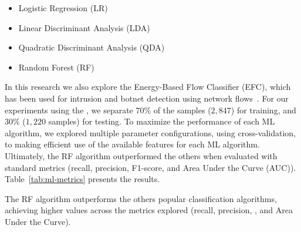
\begin{itemize}
 \item Logistic Regression (LR)
 \item Linear Discriminant Analysis (LDA)
 \item Quadratic Discriminant Analysis (QDA)
 \item Random Forest (RF)
\end{itemize}


In this research we also explore the Energy-Based Flow Classifier (EFC), which has been used for intrusion and botnet detection using
network flows~\cite{DBLP:journals/tnsm/PontesSGBM21}. For our experiments using the \fds, we separate $70\%$ of the samples ($2,847$) for
training, and $30\%$ ($1,220$ samples) for testing. To maximize the performance of each ML algorithm, we explored multiple parameter configurations, using cross-validation, to making efficient use of the available features for each ML algorithm.
Ultimately, the RF algorithm outperformed the others when evaluated with standard metrics (recall, precision, F1-score, and Area Under the Curve (AUC)).
Table~\ref{tab:ml-metrics} presents the results. 

\begin{table}[htb]
    \caption{Accuracy of the ML algorithms to classify the app as malware or non-malware using network flow data from the \fds.}
 \label{tab:ml-metrics}
\end{table}

\begin{finding}
  The RF algorithm outperforms the others popular classification algorithms, achieving higher values across the metrics explored (recall, precision, \fone, and Area Under the Curve).
\end{finding}

